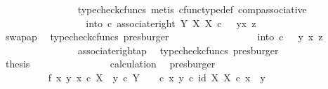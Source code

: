 \begin{isabellebody}
\ \ \ \ \ \ \ \ \ \ \ \ \ \ \isamarkupfalse%
\ {\isacharparenleft}{\kern0pt}typecheck{\isacharunderscore}{\kern0pt}cfuncs{\isacharcomma}{\kern0pt}\ metis\ cfunc{\isacharunderscore}{\kern0pt}type{\isacharunderscore}{\kern0pt}def\ comp{\isacharunderscore}{\kern0pt}associative{\isacharparenright}{\kern0pt}\isanewline
\ \ \ \ \ \ \ \ \ \ \ \ \isamarkupfalse%
\ \isamarkupfalse%
\ {\isachardoublequoteopen}{\isachardot}{\kern0pt}{\isachardot}{\kern0pt}{\isachardot}{\kern0pt}\ {\isacharequal}{\kern0pt}\ into\ {\isasymcirc}\isactrlsub c\ associate{\isacharunderscore}{\kern0pt}right\ Y\ X\ X\ {\isasymcirc}\isactrlsub c\ \ \ {\isasymlangle}{\isasymlangle}y{\isacharcomma}{\kern0pt}x{\isasymrangle}{\isacharcomma}{\kern0pt}\ z{\isasymrangle}{\isachardoublequoteclose}\isanewline
\ \ \ \ \ \ \ \ \ \ \ \ \ \ \isamarkupfalse%
\ swap{\isacharunderscore}{\kern0pt}ap\ \isamarkupfalse%
\ {\isacharparenleft}{\kern0pt}typecheck{\isacharunderscore}{\kern0pt}cfuncs{\isacharcomma}{\kern0pt}\ presburger{\isacharparenright}{\kern0pt}\isanewline
\ \ \ \ \ \ \ \ \ \ \ \ \isamarkupfalse%
\ \isamarkupfalse%
\ {\isachardoublequoteopen}{\isachardot}{\kern0pt}{\isachardot}{\kern0pt}{\isachardot}{\kern0pt}\ {\isacharequal}{\kern0pt}\ into\ {\isasymcirc}\isactrlsub c\ \ \ {\isasymlangle}y{\isacharcomma}{\kern0pt}\ {\isasymlangle}x{\isacharcomma}{\kern0pt}\ z{\isasymrangle}{\isasymrangle}{\isachardoublequoteclose}\isanewline
\ \ \ \ \ \ \ \ \ \ \ \ \ \ \isamarkupfalse%
\ associate{\isacharunderscore}{\kern0pt}right{\isacharunderscore}{\kern0pt}ap\ \isamarkupfalse%
\ {\isacharparenleft}{\kern0pt}typecheck{\isacharunderscore}{\kern0pt}cfuncs{\isacharcomma}{\kern0pt}\ presburger{\isacharparenright}{\kern0pt}\isanewline
\ \ \ \ \ \ \ \ \ \ \ \ \isamarkupfalse%
\ \isamarkupfalse%
\ {\isacharquery}{\kern0pt}thesis\isanewline
\ \ \ \ \ \ \ \ \ \ \ \ \ \ \isamarkupfalse%
\ calculation\ \isamarkupfalse%
\ presburger\isanewline
\ \ \ \ \ \ \ \ \ \ \isamarkupfalse%
\isanewline
\ \ \ \ \ \ \ \ \isamarkupfalse%
\isanewline
\ \ \isanewline
\ \ \ \ \ \ \ \ \isamarkupfalse%
\ f{}{\isacharcolon}{\kern0pt}\ {\isachardoublequoteopen}{\isasymAnd}x\ y{\isachardot}{\kern0pt}\ x\ {\isasymin}\isactrlsub c\ X\ {\isasymLongrightarrow}\ y\ {\isasymin}\isactrlsub c\ Y\ \ {\isasymLongrightarrow}\ {\isacharparenleft}{\kern0pt}{\isasymTheta}\ {\isasymcirc}\isactrlsub c\ {\isasymlangle}x{\isacharcomma}{\kern0pt}\ y{\isasymrangle}{\isacharparenright}{\kern0pt}\isactrlsup {\isasymflat}\ {\isasymcirc}\isactrlsub c\ {\isasymlangle}id\ X{\isacharcomma}{\kern0pt}\ {\isasymbeta}\isactrlbsub X\isactrlesub {\isasymrangle}\ {\isasymcirc}\isactrlsub c\ x\ {\isacharequal}{\kern0pt}\ y{\isachardoublequoteclose}\isanewline

\end{isabellebody}
